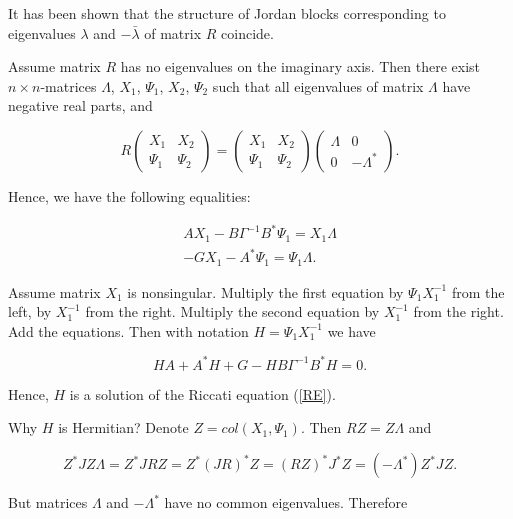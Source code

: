 \documentclass[11pt, reqno]{amsart}
\theoremstyle{plain}
\begin{document}
\noindent It has been shown \cite{ricci} that the structure of Jordan blocks corresponding to eigenvalues $\lambda$ and $-\bar\lambda$ of matrix $R$ coincide. 

Assume matrix $R$ has no eigenvalues on the imaginary axis. Then there exist $n\times n$-matrices $\Lambda$, $X_{1}$, $\Psi_{1}$, $X_{2}$, $\Psi_{2}$ such that all eigenvalues of matrix $\Lambda$ have negative real parts, and 

\begin{equation}\label{RI}
 R \left(\begin{array}{cc} X_{1} & X_{2} \\ \Psi_{1} & \Psi_{2} \end{array}\right) =
\left(\begin{array}{cc} X_{1} & X_{2} \\ \Psi_{1} & \Psi_{2} \end{array}\right)
\left(\begin{array}{cc} \Lambda & 0 \\ 0 & -\Lambda^{*} \end{array}\right).
\end{equation}

\noindent Hence, we have the following equalities:

$$\begin{array}{c} 
AX_{1} - B\Gamma^{-1}B^{*}\Psi_{1} = X_{1}\Lambda \\ -GX_{1}-A^{*}\Psi_{1}=\Psi_{1}\Lambda. \end{array} $$

Assume matrix $X_{1}$ is nonsingular. Multiply the first equation by $\Psi_{1}X_{1}^{-1}$ from the left, by $X_{1}^{-1}$ from the right. Multiply the second equation by $X_{1}^{-1}$ from the right. Add the equations. Then with notation $H=\Psi_{1}X_{1}^{-1}$ we have

\begin{equation}\label{RE}
HA + A^{*}H + G - HB\Gamma^{-1}B^{*}H = 0.
\end{equation}

Hence, $H$ is a solution of the Riccati equation (\ref{RE}). 

Why $H$ is Hermitian? Denote $Z=col(X_{1},\Psi_{1})$. Then $RZ=Z\Lambda$ and

$$ Z^{*}JZ\Lambda =Z^{*}JRZ = Z^{*}(JR)^{*}Z = (RZ)^{*}J^{*}Z = (-\Lambda^{*})Z^{*}JZ.$$

\noindent But matrices $\Lambda$ and $-\Lambda^{*}$ have no common eigenvalues. Therefore 
\end{document}

